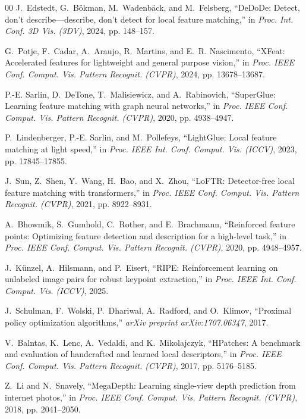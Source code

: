 \documentclass[conference]{IEEEtran}
\begin{document}
\begin{thebibliography}{00}
J.~Edstedt, G.~B{\"o}kman, M.~Wadenb{\"a}ck, and M.~Felsberg, ``DeDoDe: Detect, don't describe---describe, don't detect for local feature matching,'' in \textit{Proc. Int. Conf. 3D Vis. (3DV)}, 2024, pp. 148--157.

G.~Potje, F.~Cadar, A.~Araujo, R.~Martins, and E.~R. Nascimento, ``XFeat: Accelerated features for lightweight and general purpose vision,'' in \textit{Proc. IEEE Conf. Comput. Vis. Pattern Recognit. (CVPR)}, 2024, pp. 13678--13687.

P.-E. Sarlin, D.~DeTone, T.~Malisiewicz, and A.~Rabinovich, ``SuperGlue: Learning feature matching with graph neural networks,'' in \textit{Proc. IEEE Conf. Comput. Vis. Pattern Recognit. (CVPR)}, 2020, pp. 4938--4947.

P.~Lindenberger, P.-E. Sarlin, and M.~Pollefeys, ``LightGlue: Local feature matching at light speed,'' in \textit{Proc. IEEE Int. Conf. Comput. Vis. (ICCV)}, 2023, pp. 17845--17855.

J.~Sun, Z.~Shen, Y.~Wang, H.~Bao, and X.~Zhou, ``LoFTR: Detector-free local feature matching with transformers,'' in \textit{Proc. IEEE Conf. Comput. Vis. Pattern Recognit. (CVPR)}, 2021, pp. 8922--8931.

A.~Bhowmik, S.~Gumhold, C.~Rother, and E.~Brachmann, ``Reinforced feature points: Optimizing feature detection and description for a high-level task,'' in \textit{Proc. IEEE Conf. Comput. Vis. Pattern Recognit. (CVPR)}, 2020, pp. 4948--4957.

J.~K{\"u}nzel, A.~Hilsmann, and P.~Eisert, ``RIPE: Reinforcement learning on unlabeled image pairs for robust keypoint extraction,'' in \textit{Proc. IEEE Int. Conf. Comput. Vis. (ICCV)}, 2025.

J.~Schulman, F.~Wolski, P.~Dhariwal, A.~Radford, and O.~Klimov, ``Proximal policy optimization algorithms,'' \textit{arXiv preprint arXiv:1707.06347}, 2017.

V.~Balntas, K.~Lenc, A.~Vedaldi, and K.~Mikolajczyk, ``HPatches: A benchmark and evaluation of handcrafted and learned local descriptors,'' in \textit{Proc. IEEE Conf. Comput. Vis. Pattern Recognit. (CVPR)}, 2017, pp. 5176--5185.

Z.~Li and N.~Snavely, ``MegaDepth: Learning single-view depth prediction from internet photos,'' in \textit{Proc. IEEE Conf. Comput. Vis. Pattern Recognit. (CVPR)}, 2018, pp. 2041--2050.

\end{thebibliography}
\end{document}
